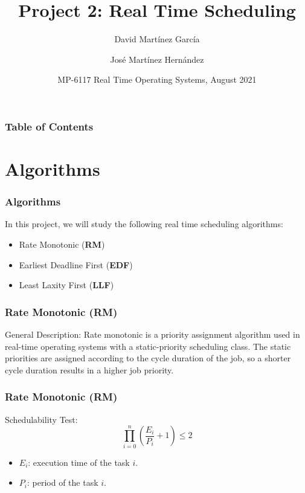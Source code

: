 \documentclass[xcolor=table]{beamer}
\title[Real Time Scheduling] %
{Project 2: Real Time Scheduling}
\author[ David Martínez, José Martínez] %
{David Martínez García\inst{1} \and José Martínez Hernández\inst{2}}
\institute[TEC] %
{
  \inst{1}%
  \url{david.martinez@estudiantec.cr}\\
  \textsc{2013005337}
  \and
  \inst{2}%
  \url{jpmh.1309@estudiantec.cr} \\
  \textsc{2020426476}
}
\date[August 2021] %
{MP-6117 Real Time Operating Systems, August 2021}
\begin{document}
\frame{\titlepage}


\begin{frame}
\frametitle{Table of Contents}
\tableofcontents
\end{frame}


\section{Algorithms}

\begin{frame}
\frametitle{Algorithms}
In this project, we will study the following real time scheduling algorithms:

\begin{itemize}
    \item Rate Monotonic (\textbf{RM})
    \item Earliest Deadline First (\textbf{EDF})
    \item Least Laxity First (\textbf{LLF})
\end{itemize}
\end{frame}


\begin{frame}
\frametitle{Rate Monotonic (\textbf{RM})}

\begin{alertblock}{General Description:}
Rate monotonic is a priority assignment algorithm used in real-time operating systems with a static-priority scheduling class. The static priorities are assigned according to the cycle duration of the job, so a shorter cycle duration results in a higher job priority.
\end{alertblock}

\end{frame}

\begin{frame}
\frametitle{Rate Monotonic (\textbf{RM})}

\begin{block}{Schedulability Test:}
\begin{equation}
\prod_{i=0}^{n} \left( \frac{E_i}{P_i}+1 \right) \leq 2
\end{equation}

\begin{itemize}
    \item $E_i$: execution time of the task $i$.
    \item $P_i$: period of the task $i$.
\end{itemize}
\end{block}

\end{frame}
\end{document}
